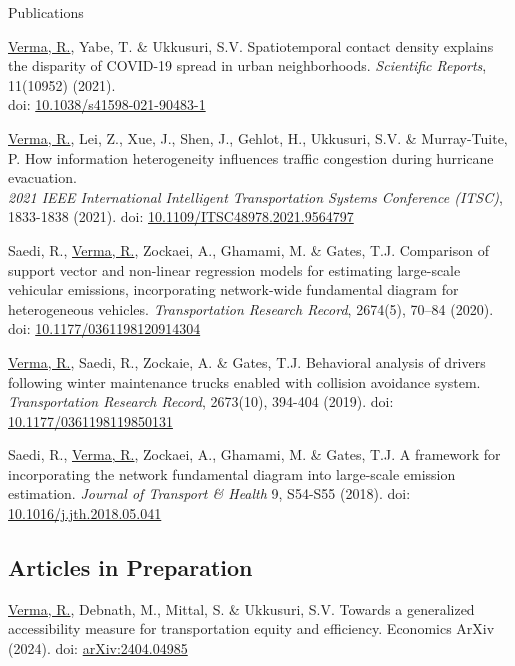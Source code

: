 \documentclass{CV} %
\begin{document}
\begin{rSection}{Publications}
\begin{etaremune}
        \item \underline{Verma, R.}, Yabe, T. \& Ukkusuri, S.V. Spatiotemporal contact density explains the disparity of COVID-19 spread in urban neighborhoods. \textit{Scientific Reports}, 11(10952) (2021).
        \\ doi: \href{https://www.nature.com/articles/s41598-021-90483-1}{10.1038/s41598-021-90483-1}
        
        \item \underline{Verma, R.}, Lei, Z., Xue, J., Shen, J., Gehlot, H., Ukkusuri, S.V. \& Murray-Tuite, P. How information heterogeneity influences traffic congestion during hurricane evacuation.
        \\ \textit{2021 IEEE International Intelligent Transportation Systems Conference (ITSC)}, 1833-1838 (2021). doi: \href{https://ieeexplore.ieee.org/document/9564797}{10.1109/ITSC48978.2021.9564797}

        \item Saedi, R., \underline{Verma, R.}, Zockaei, A., Ghamami, M. \& Gates, T.J. Comparison of support vector and non-linear regression models for estimating large-scale vehicular emissions, incorporating network-wide fundamental diagram for heterogeneous vehicles. \textit{Transportation Research Record}, 2674(5), 70–84 (2020). doi: \href{https://journals.sagepub.com/doi/abs/10.1177/0361198120914304}{10.1177/0361198120914304}
        
        \item \underline{Verma, R.}, Saedi, R., Zockaie, A. \& Gates, T.J. Behavioral analysis of drivers following winter maintenance trucks enabled with collision avoidance system. \textit{Transportation Research Record}, 2673(10), 394-404 (2019). doi: \href{https://journals.sagepub.com/doi/abs/10.1177/0361198119850131}{10.1177/0361198119850131}
        
        \item Saedi, R., \underline{Verma, R.}, Zockaei, A., Ghamami, M. \& Gates, T.J. A framework for incorporating the network fundamental diagram into large-scale emission estimation. \textit{Journal of Transport \& Health} 9, S54-S55 (2018). doi: \href{https://www.sciencedirect.com/science/article/abs/pii/S2214140518302263}{10.1016/j.jth.2018.05.041}
    \end{etaremune}
    
    \subsection*{Articles in Preparation}
    \begin{etaremune}
        \item \underline{Verma, R.}, Debnath, M., Mittal, S. \& Ukkusuri, S.V. Towards a generalized accessibility measure for transportation equity and efficiency. Economics ArXiv (2024). doi: \href{https://arxiv.org/abs/2404.04985}{arXiv:2404.04985}
    

\end{etaremune}
\end{rSection}
\end{document}
